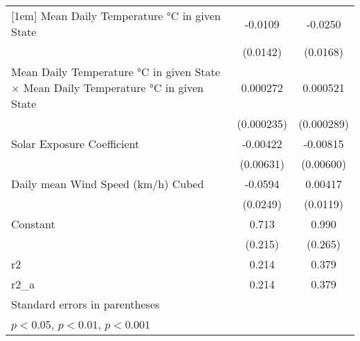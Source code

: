 {\begin{tabular}{l*{2}{c}}
[1em]
Mean Daily Temperature °C in given State&     -0.0109         &     -0.0250         \\
                    &    (0.0142)         &    (0.0168)         \\
[1em]
Mean Daily Temperature °C in given State $\times$ Mean Daily Temperature °C in given State&    0.000272         &    0.000521         \\
                    &  (0.000235)         &  (0.000289)         \\
[1em]
Solar Exposure Coefficient&    -0.00422         &    -0.00815         \\
                    &   (0.00631)         &   (0.00600)         \\
[1em]
Daily mean Wind Speed (km/h) Cubed&     -0.0594         &     0.00417         \\
                    &    (0.0249)         &    (0.0119)         \\
[1em]
Constant            &       0.713\sym{*}  &       0.990\sym{*}  \\
                    &     (0.215)         &     (0.265)         \\
\hline
r2                  &       0.214         &       0.379         \\
r2\_a                &       0.214         &       0.379         \\
\hline\hline
\multicolumn{3}{l}{\footnotesize Standard errors in parentheses}\\
\multicolumn{3}{l}{\footnotesize \sym{*} \(p<0.05\), \sym{**} \(p<0.01\), \sym{***} \(p<0.001\)}\\
\end{tabular}
}
